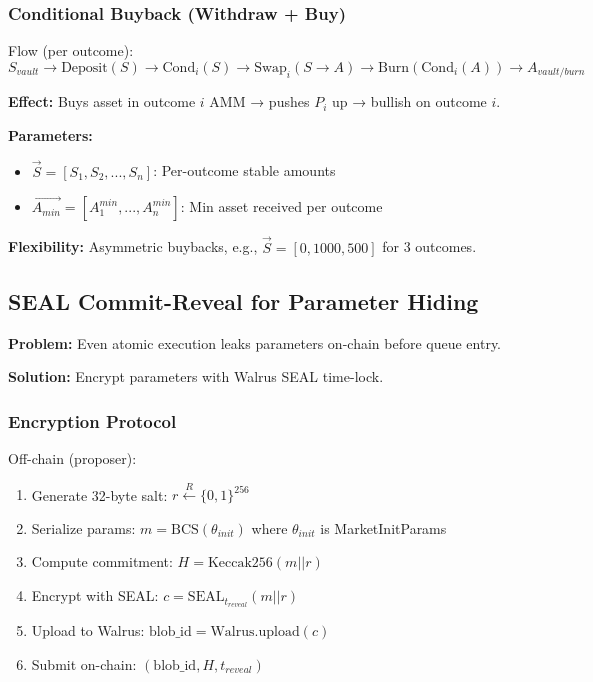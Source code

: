 \documentclass{article}
\begin{document}
\subsubsection{Conditional Buyback (Withdraw + Buy)}

Flow (per outcome):
$$S_{vault} \to \text{Deposit}(S) \to \text{Cond}_i(S) \to \text{Swap}_i(S \to A) \to \text{Burn}(\text{Cond}_i(A)) \to A_{vault/burn}$$

\textbf{Effect:} Buys asset in outcome $i$ AMM → pushes $P_i$ up → bullish on outcome $i$.

\textbf{Parameters:}
\begin{itemize}
\item $\vec{S} = [S_1, S_2, ..., S_n]$: Per-outcome stable amounts
\item $\vec{A_{min}} = [A_1^{min}, ..., A_n^{min}]$: Min asset received per outcome
\end{itemize}

\textbf{Flexibility:} Asymmetric buybacks, e.g., $\vec{S} = [0, 1000, 500]$ for 3 outcomes.

\subsection{SEAL Commit-Reveal for Parameter Hiding}

\textbf{Problem:} Even atomic execution leaks parameters on-chain before queue entry.

\textbf{Solution:} Encrypt parameters with Walrus SEAL time-lock.

\subsubsection{Encryption Protocol}

Off-chain (proposer):
\begin{enumerate}
\item Generate 32-byte salt: $r \xleftarrow{R} \{0,1\}^{256}$
\item Serialize params: $m = \text{BCS}(\theta_{init})$ where $\theta_{init}$ is MarketInitParams
\item Compute commitment: $H = \text{Keccak256}(m || r)$
\item Encrypt with SEAL: $c = \text{SEAL}_{t_{reveal}}(m || r)$
\item Upload to Walrus: $\text{blob\_id} = \text{Walrus.upload}(c)$
\item Submit on-chain: $(\text{blob\_id}, H, t_{reveal})$
\end{enumerate}
\end{document}
